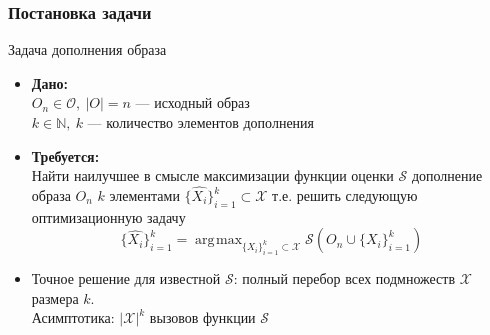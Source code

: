 \documentclass[10pt]{beamer}
\DeclareMathOperator*{\argmax}{\arg\!\max}
\begin{document}
\begin{frame}
	\frametitle{Постановка задачи}
	\begin{block}{Задача дополнения образа}
		\begin{itemize}
			\item \textbf{Дано:}\\
			$O_n\in\mathcal{O}, ~|O| = n$ --- исходный образ \\
			$k \in \mathbb{N}, ~k$ --- количество элементов дополнения \\	
			
			\item \textbf{Требуется:}\\
			Найти наилучшее в смысле максимизации функции оценки $\mathcal{S}$ дополнение образа $O_n$  $k$ элементами $\{\hat{X_i}\}_{i=1}^k\subset \mathcal{X}$ т.е. решить следующую оптимизационную задачу
			$$\{\hat{X_i}\}_{i=1}^k= \argmax_{\{X_i\}_{i=1}^k\subset\mathcal{X}} \mathcal{S}\left(O_n\cup\{X_i\}_{i=1}^k\right)$$
			\item  Точное решение для известной $\mathcal{S}$: полный перебор всех подмножеств $\mathcal{X}$ размера $k$.\\
			Асимптотика: $|\mathcal{X}|^k$ вызовов функции $\mathcal{S}$
		\end{itemize}
	\end{block}					
\end{frame}
\end{document}
